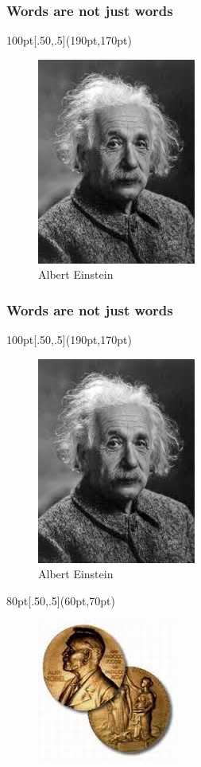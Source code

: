 \begin{frame}
 \frametitle{Words are not just words}
\begin{textblock*}{100pt}[.50,.5](190pt,170pt)
\begin{figure}[h]
 \centering
 \includegraphics[bb=0 0 197 256,scale=0.5]{./einstein.jpg}
  \caption{Albert Einstein}
\end{figure}
\end{textblock*}
\end{frame}
\begin{frame}
 \frametitle{Words are not just words}
\begin{textblock*}{100pt}[.50,.5](190pt,170pt)
\begin{figure}[h]
 \centering
 \includegraphics[bb=0 0 197 256,scale=0.5]{./einstein.jpg}
  \caption{Albert Einstein}
\end{figure}
\end{textblock*}
\begin{textblock*}{80pt}[.50,.5](60pt,70pt)
\begin{figure}[h]
 \centering
 \includegraphics[bb=0 0 197 256,scale=0.5]{./nobel.jpg}
\end{figure}
\end{textblock*}

\end{frame}
